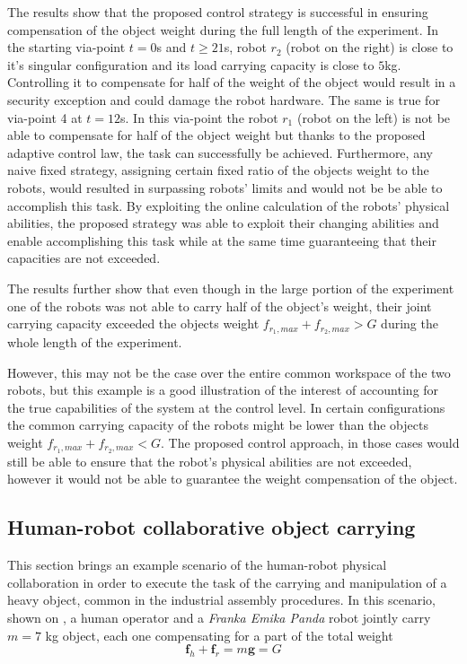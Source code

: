 The results show that the proposed control strategy is successful in ensuring compensation of the object weight during the full length of the experiment. In the starting via-point $t=0$s and $t\geq21$s, robot $r_2$ (robot on the right) is close to it's singular configuration and its load carrying capacity is close to $5$kg. Controlling it to compensate for half of the weight of the object would result in a security exception and could damage the robot hardware. The same is true for via-point 4 at $t=12$s. In this via-point the robot $r_1$ (robot on the left) is not be able to compensate for half of the object weight but thanks to the proposed adaptive control law, the task can successfully be achieved. 
Furthermore, any naive fixed strategy, assigning certain fixed ratio of the objects weight to the robots, would resulted in surpassing robots' limits and would not be be able to accomplish this task. By exploiting the online calculation of the robots' physical abilities, the proposed strategy was able to exploit their changing abilities and enable accomplishing this task while at the same time guaranteeing that their capacities are not exceeded.

The results further show that even though in the large portion of the experiment one of the robots was not able to carry half of the object's weight, their joint carrying capacity exceeded the objects weight $f_{r_1,max}+f_{r_2,max} >G$ during the whole length of the experiment. 

However, this may not be the case over the entire common workspace of the two robots, but this example is a good illustration of the interest of accounting for the true capabilities of the system at the control level.  In certain configurations the common carrying capacity of the robots might be lower than the objects weight $f_{r_1,max}+f_{r_2,max} <G$. The proposed control approach, in those cases would still be able to ensure that the robot's physical abilities are not exceeded, however it would not be able to guarantee the weight compensation of the object. 



\subsection{Human-robot collaborative object carrying}
\label{ch:human_robot_carrying}

This section brings an example scenario of the human-robot physical collaboration in order to execute the task of the carrying and manipulation of a heavy object, common in the industrial assembly procedures. In this scenario, shown on , a human operator and a \textit{Franka Emika Panda} robot jointly carry $m\!=\!7$ kg object, each one compensating for a part of the total weight 
\begin{equation}
    \bm{f}_h  + \bm{f}_r = m\bm{g} = G
\end{equation}

